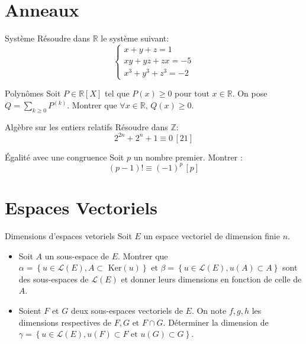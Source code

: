 \documentclass[french, a4paper, 11pt]{article}
\newcommand{\R}{\mathbb{R}}   %
\newcommand{\co}{\left[}         %
\newcommand{\cf}{\right]}        %
\newcommand{\cof}[1]{\co #1 \cf} %
\begin{document}
\section*{Anneaux}
\begin{cadre}{Système}
  Résoudre dans \(\R\) le système suivant:
  \[\begin{cases}
      x+y+z = 1\\
      xy + yz + zx = -5\\
      x^{3}+y^{3}+z^{3} = -2
  \end{cases}\]
\end{cadre}

\begin{cadre}{Polynômes}
  Soit \(P\in\R\cof{X}\) tel que \(P(x)\geqslant 0\) pour tout \(x\in\R\). On pose \(Q = \sum_{k\geqslant 0}P^{(k)}\).
  Montrer que \(\forall x \in\R,\,Q(x)\geqslant 0\).
\end{cadre}

\begin{cadre}{Algèbre sur les entiers relatifs}
  Résoudre dans \(\mathbb Z\):
    \[2^{2n}+2^n+1 \equiv 0 \, \cof{21} \]
\end{cadre}

\begin{cadre}{Égalité avec une congruence}
  Soit \(p\) un nombre premier. Montrer :
    \[(p-1)! \equiv (-1)^p \, \cof{p}\]
\end{cadre}

\section*{Espaces Vectoriels}

\begin{cadre}{Dimensions d'espaces vetoriels}
  Soit $E$ un espace vectoriel de dimension finie $n$.
  \begin{itemize}[label=$\bullet$]
    \item Soit $A$ un sous-espace de $E$. Montrer que \(\alpha=\left\{ u \in \mathcal{L}(E), A \subset \text{ Ker}(u)\right\}
  \text{ et } \beta=\left\{ u \in \mathcal{L}(E), u(A) \subset A\right\}\) sont des sous-espaces de $\mathcal{L}(E)$
  et donner leurs dimensions en fonction de celle de $A$.
    \item Soient $F$ et $G$ deux sous-espaces vectoriels de $E$. On note $f,g,h$ les dimensions respectives de \(F,G \text{ et } {F \cap G}\).
  Déterminer la dimension de \(\gamma=\left\{ u \in \mathcal{L}(E), u(F) \subset F \text{ et } u(G) \subset G\right\}\).
  \end{itemize}
\end{cadre}
\end{document}
